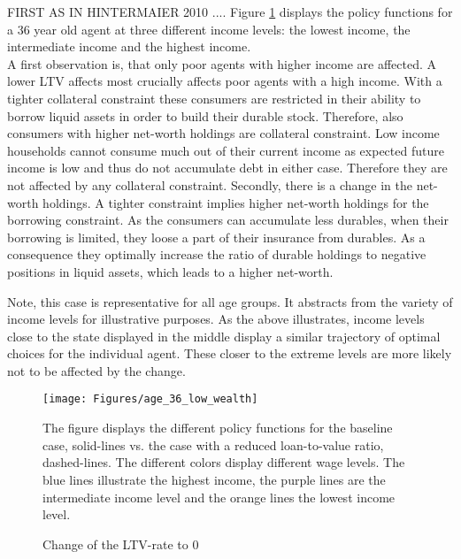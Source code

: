 \documentclass[a4paper,12pt,legno]{article}
\begin{document}
FIRST AS IN HINTERMAIER 2010 \cite{hintermaier2010}....
Figure \ref{policy_downpayment0_age36} displays the policy functions for a 36 year old agent at three different income levels: the lowest income, the intermediate income and the highest income. \\ A first observation is, that only poor agents with higher income are affected. A lower LTV affects most crucially affects poor agents with a high income. With a tighter collateral constraint these consumers are restricted in their ability to borrow liquid assets in order to build their durable stock. Therefore, also consumers with higher net-worth holdings are collateral constraint. Low income households cannot consume much out of their current income as expected future income is low and thus do not accumulate debt in either case. Therefore they are not affected by any collateral constraint. 
Secondly, there is a change in the net-worth holdings. A tighter constraint implies higher net-worth holdings for the borrowing constraint. As the consumers can accumulate less durables, when their borrowing is limited, they loose a part of their insurance from durables. As a consequence they optimally increase the ratio of durable holdings to negative positions in liquid assets, which leads to a higher net-worth. 


 Note, this case is representative for all age groups. It abstracts from the variety of income levels for illustrative purposes. As the above illustrates, income levels close to the state displayed in the middle display a similar trajectory of optimal choices for the individual agent. These closer to the extreme levels are more likely not to be affected by the change. 

\begin{figure}[!htbp]
\caption{Change of the LTV-rate to $0$} 
\label{policy_downpayment0_age36}	%
\centering
\texttt{[image: Figures/age\_36\_low\_wealth]}  %

\begin{minipage}{0.8\linewidth}
\footnotesize{The figure displays the different policy functions for the baseline case, solid-lines vs. the case with a reduced loan-to-value ratio, dashed-lines. The different colors display different wage levels. The blue lines illustrate the highest income, the purple lines are the intermediate income level and the orange lines the lowest income level.}
\end{minipage}

\end{figure}
\end{document}

